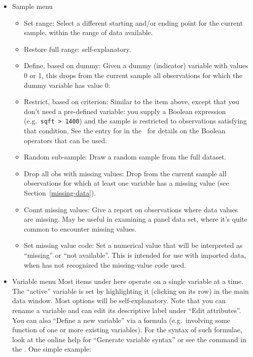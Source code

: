 \begin{itemize}
\item \textsf{Sample menu}
  \begin{itemize}
  \item \textsf{Set range}: Select a different starting and/or ending
    point for the current sample, within the range of data available.
  \item \textsf{Restore full range}: self-explanatory.
  \item \textsf{Define, based on dummy}: Given a dummy (indicator)
    variable with values 0 or 1, this drops from the current sample
    all observations for which the dummy variable has value 0.
  \item \textsf{Restrict, based on criterion}: Similar to the item
    above, except that you don't need a pre-defined variable: you
    supply a Boolean expression (e.g.\ \verb+sqft > 1400+) and the
    sample is restricted to observations satisfying that condition.
    See the entry for  in the \GCR\
    for details on the Boolean operators that can be used.
  \item \textsf{Random sub-sample}: Draw a random sample from the full dataset.
  \item \textsf{Drop all obs with missing values}: Drop from the
    current sample all observations for which at least one variable
    has a missing value (see Section~\ref{missing-data}).
  \item \textsf{Count missing values}: Give a report on observations
    where data values are missing. May be useful in examining a panel
    data set, where it's quite common to encounter missing values.
  \item \textsf{Set missing value code}: Set a numerical value that
    will be interpreted as ``missing'' or ``not available''.  This is
    intended for use with imported data, when \app{gretl} has not
    recognized the missing-value code used.
  \end{itemize}

\item \textsf{Variable menu} Most items under here operate on a single
  variable at a time.  The ``active'' variable is set by highlighting
  it (clicking on its row) in the main data window.  Most options will
  be self-explanatory.  Note that you can rename a variable and can
  edit its descriptive label under ``Edit attributes''. You can also
  ``Define a new variable'' via a formula (e.g.\ involving some
  function of one or more existing variables). For the syntax of such
  formulae, look at the online help for ``Generate variable syntax''
  or see the \cmd{genr} command in the \GCR.
  One simple example:
          

\end{itemize}

